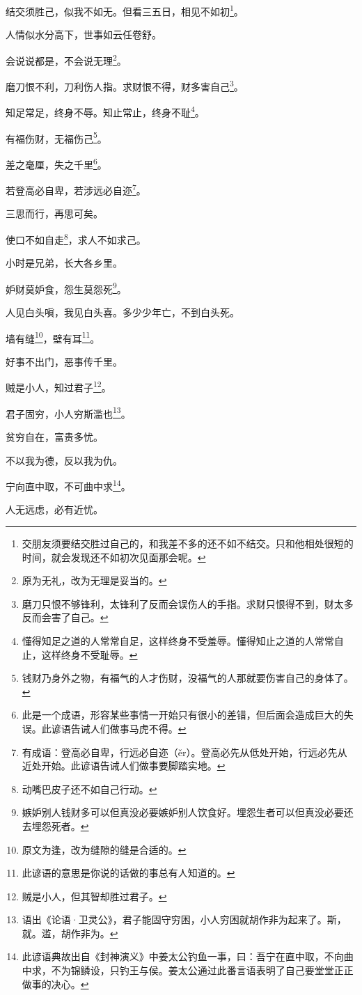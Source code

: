 \documentclass[12pt,oneside]{book}
\begin{document}
结交须胜己，似我不如无。但看三五日，相见不如初\footnote{交朋友须要结交胜过自己的，和我差不多的还不如不结交。只和他相处很短的时间，就会发现还不如初次见面那会呢。}。

人情似水分高下，世事如云任卷舒。

会说说都是，不会说无理\footnote{原为无礼，改为无理是妥当的。}。

磨刀恨不利，刀利伤人指。求财恨不得，财多害自己\footnote{磨刀只恨不够锋利，太锋利了反而会误伤人的手指。求财只恨得不到，财太多反而会害了自己。}。

知足常足，终身不辱。知止常止，终身不耻\footnote{懂得知足之道的人常常自足，这样终身不受羞辱。懂得知止之道的人常常自止，这样终身不受耻辱。}。

有福伤财，无福伤己\footnote{钱财乃身外之物，有福气的人才伤财，没福气的人那就要伤害自己的身体了。}。

差之毫厘，失之千里\footnote{此是一个成语，形容某些事情一开始只有很小的差错，但后面会造成巨大的失误。此谚语告诫人们做事马虎不得。}。

若登高必自卑，若涉远必自迩\footnote{有成语：登高必自卑，行远必自迩（ěr）。登高必先从低处开始，行远必先从近处开始。此谚语告诫人们做事要脚踏实地。}。

三思而行，再思可矣。

使口不如自走\footnote{动嘴巴皮子还不如自己行动。}，求人不如求己。

小时是兄弟，长大各乡里。

妒财莫妒食，怨生莫怨死\footnote{嫉妒别人钱财多可以但真没必要嫉妒别人饮食好。埋怨生者可以但真没必要还去埋怨死者。}。

人见白头嗔，我见白头喜。多少少年亡，不到白头死。

墙有缝\footnote{原文为逢，改为缝隙的缝是合适的。}，壁有耳\footnote{此谚语的意思是你说的话做的事总有人知道的。}。

好事不出门，恶事传千里。

贼是小人，知过君子\footnote{贼是小人，但其智却胜过君子。}。

君子固穷，小人穷斯滥也\footnote{语出《论语·卫灵公》，君子能固守穷困，小人穷困就胡作非为起来了。斯，就。滥，胡作非为。}。

贫穷自在，富贵多忧。

不以我为德，反以我为仇。

宁向直中取，不可曲中求\footnote{此谚语典故出自《封神演义》中姜太公钓鱼一事，曰：吾宁在直中取，不向曲中求，不为锦鳞设，只钓王与侯。姜太公通过此番言语表明了自己要堂堂正正做事的决心。}。

人无远虑，必有近忧。
\end{document}
